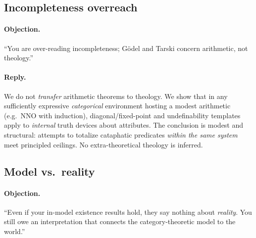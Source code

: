 \documentclass[11pt]{article}
\theoremstyle{upright}
\begin{document}
\subsection{Incompleteness overreach}
\paragraph{Objection.}
“You are over-reading incompleteness; Gödel and Tarski concern arithmetic, not theology.”

\paragraph{Reply.}
We do not \emph{transfer} arithmetic theorems to theology. We show that in any sufficiently expressive \emph{categorical} environment hosting a modest arithmetic (e.g.\ NNO with induction), diagonal/fixed-point and undefinability templates apply to \emph{internal} truth devices about attributes. The conclusion is modest and structural: attempts to totalize cataphatic predicates \emph{within the same system} meet principled ceilings. No extra-theoretical theology is inferred.

\subsection{Model vs.\ reality}
\paragraph{Objection.}
“Even if your in-model existence results hold, they say nothing about \emph{reality}. You still owe an interpretation that connects the category-theoretic model to the world.”
\end{document}
